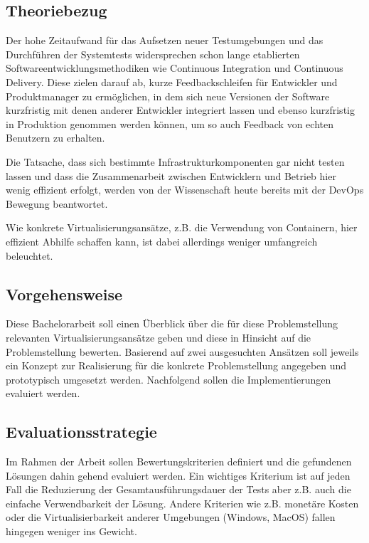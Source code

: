 \subsection{Theoriebezug}

Der hohe Zeitaufwand für das Aufsetzen neuer Testumgebungen und das Durchführen der Systemtests widersprechen schon lange etablierten Softwareentwicklungsmethodiken wie Continuous Integration und Continuous Delivery. Diese zielen darauf ab, kurze Feedbackschleifen für Entwickler und Produktmanager zu ermöglichen, in dem sich neue Versionen der Software kurzfristig mit denen anderer Entwickler integriert lassen und ebenso kurzfristig in Produktion genommen werden können, um so auch Feedback von echten Benutzern zu erhalten.

Die Tatsache, dass sich bestimmte Infrastrukturkomponenten gar nicht testen lassen und dass die Zusammenarbeit zwischen Entwicklern und Betrieb hier wenig effizient erfolgt, werden von der Wissenschaft heute bereits mit der DevOps Bewegung beantwortet.

Wie konkrete Virtualisierungsansätze, z.B. die Verwendung von Containern, hier effizient Abhilfe schaffen kann, ist dabei allerdings weniger umfangreich beleuchtet.

\subsection{Vorgehensweise}

Diese Bachelorarbeit soll einen Überblick über die für diese Problemstellung relevanten Virtualisierungsansätze geben und diese in Hinsicht auf die Problemstellung bewerten. Basierend auf zwei ausgesuchten Ansätzen soll jeweils ein Konzept zur Realisierung für die konkrete Problemstellung angegeben und prototypisch umgesetzt werden. Nachfolgend sollen die Implementierungen evaluiert werden.

\subsection{Evaluationsstrategie}

Im Rahmen der Arbeit sollen Bewertungskriterien definiert und die gefundenen Lösungen dahin gehend evaluiert werden. Ein wichtiges Kriterium ist auf jeden Fall die Reduzierung der Gesamtausführungsdauer der Tests aber z.B. auch die einfache Verwendbarkeit der Lösung. Andere Kriterien wie z.B. monetäre Kosten oder die Virtualisierbarkeit anderer Umgebungen (Windows, MacOS) fallen hingegen weniger ins Gewicht.